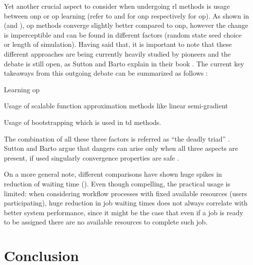\documentclass{seal_thesis}
\begin{document}
Yet another crucial aspect to consider when undergoing \gls{rl} methods is usage between \gls{onp} or \gls{op} learning (refer to  and  for \gls{onp} respectively  for \gls{op}). As shown in  (and ), \gls{op} methods converge slightly better compared to \gls{onp}, however the change is imperceptible and can be found in different factors (\eg random state seed choice or length of simulation). Having said that, it is important to note that these different approaches are being currently heavily studied by pioneers and the debate is still open, as Sutton and Barto explain in their book \cite[pp. 245-249]{Sutton2017}. The current key takeaways from this outgoing debate can be summarized as follows \cite{Sutton2017}:
\begin{enumerate*}
	\item Learning \gls{op}
	\item Usage of scalable function approximation methods like linear semi-gradient 
	\item Usage of bootstrapping which is used in \gls{td} methods.
\end{enumerate*}

The combination of all these three factors is referred as ``the deadly triad'' \cite[p. 249]{Sutton2017}. Sutton and Barto argue that dangers can arise only when all three aspects are present, if used singularly convergence properties are safe \cite[p. 249]{Sutton2017}.

On a more general note, different comparisons have shown huge spikes in reduction of waiting time (\eg {}). Even though compelling, the practical usage is limited: when considering workflow processes with fixed available resources (\ie users participating), huge reduction in job waiting times does not always correlate with better system performance, since it might be the case that even if a job is ready to be assigned there are no available resources to complete such job.



\chapter{Conclusion}
\label{ch:conclusion}
\end{document}
